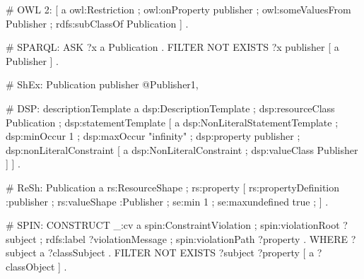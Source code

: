 \documentclass{llncs}
\newcommand{\ms}[1]{\texttt{#1}}
\newenvironment{DL}{
  \vspace{0cm}
	\begin{center}
  \begin{tabular}{r l}

}{
  \end{tabular}
	\end{center}
}
\begin{document}
\begin{ex}
# OWL 2:
[ a owl:Restriction ;
  owl:onProperty publisher ;
  owl:someValuesFrom Publisher ;
  rdfs:subClassOf Publication ] .
	
# SPARQL:
ASK { ?x a Publication . FILTER NOT EXISTS { ?x publisher [ a Publisher ] } . }
	
# ShEx:
Publication {
    publisher @Publisher{1,} }
		
# DSP:
descriptionTemplate a dsp:DescriptionTemplate ;
    dsp:resourceClass Publication ; 
    dsp:statementTemplate [ a dsp:NonLiteralStatementTemplate ;
        dsp:minOccur 1 ; dsp:maxOccur "infinity" ; 
        dsp:property publisher ; 
        dsp:nonLiteralConstraint [ a dsp:NonLiteralConstraint ;
            dsp:valueClass Publisher ] ] .
		
# ReSh:
Publication a rs:ResourceShape ; rs:property [
    rs:propertyDefinition :publisher ;
    rs:valueShape :Publisher ;
    se:min 1 ; se:maxundefined true ; ] .
		
# SPIN:
CONSTRUCT {
    _:cv a spin:ConstraintViolation ; spin:violationRoot ?subject ;
         rdfs:label ?violationMessage ; spin:violationPath ?property . } WHERE 
{ ?subject a ?classSubject . FILTER NOT EXISTS { ?subject ?property [ a ?classObject ] } . }
\end{ex}




\end{document}
